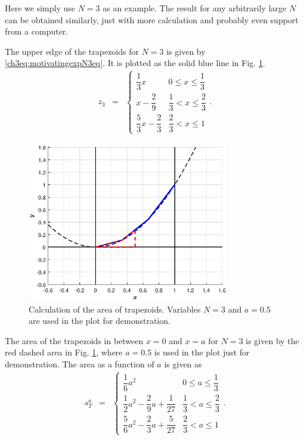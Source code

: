 Here we simply use $N=3$ as an example. The result for any arbitrarily large $N$ can be obtained similarly, just with more calculation and probably even support from a computer.

The upper edge of the trapezoids for $N=3$ is given by \ref{ch3eq:motivatingexpN3eq}. It is plotted as the solid blue line in Fig. \ref{ch3fig:motivatingexpN3tra}.
\begin{eqnarray}
    z_{3} &=& \left\{\begin{array}{cc}
        \dfrac{1}{3}x & 0 \leq x \leq \dfrac{1}{3} \\
        x - \dfrac{2}{9} & \dfrac{1}{3} < x \leq \dfrac{2}{3} \\
        \dfrac{5}{3}x - \dfrac{2}{3} & \dfrac{2}{3} < x \leq 1
    \end{array}\right. .\label{ch3eq:motivatingexpN3eq}
\end{eqnarray}

\begin{figure}
\centering
\includegraphics[width=250pt]{chapters/chapter3/figures/motivatingexpN3tra.eps}
\caption{Calculation of the area of trapezoids. Variables $N=3$ and $a=0.5$ are used in the plot for demonstration.} \label{ch3fig:motivatingexpN3tra}
\end{figure}

The area of the trapezoids in between $x=0$ and $x=a$ for $N=3$ is given by the red dashed area in Fig. \ref{ch3fig:motivatingexpN3tra}, where $a=0.5$ is used in the plot just for demonstration. The area as a function of $a$ is given as
\begin{eqnarray}
   s_{T}^a &=& \left\{\begin{array}{cc}
        \dfrac{1}{6}a^2 & 0 \leq a \leq \dfrac{1}{3} \\
        \dfrac{1}{2}a^2 - \dfrac{2}{9}a + \dfrac{1}{27} & \dfrac{1}{3} < a \leq \dfrac{2}{3} \\
        \dfrac{5}{6}a^2 - \dfrac{2}{3}a + \dfrac{5}{27} & \dfrac{2}{3} < a \leq 1
    \end{array}\right.. \label{ch3eq:motivatingexpN3eqint}
\end{eqnarray}

